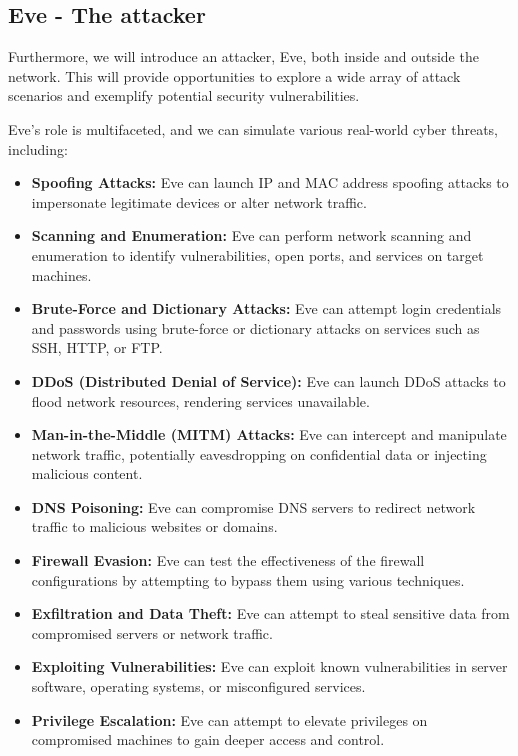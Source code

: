 \documentclass[a4paper,11pt,singlespacing]{article}
\begin{document}
\newpage

\subsection{Eve - The attacker}
Furthermore, we will introduce an attacker, Eve, both inside and outside the network. This will provide opportunities to explore a wide array of attack scenarios and exemplify potential security vulnerabilities.

Eve's role is multifaceted, and we can simulate various real-world cyber threats, including:

\begin{itemize}
    \item \textbf{Spoofing Attacks:} Eve can launch IP and MAC address spoofing attacks to impersonate legitimate devices or alter network traffic.

    \item \textbf{Scanning and Enumeration:} Eve can perform network scanning and enumeration to identify vulnerabilities, open ports, and services on target machines.

    \item \textbf{Brute-Force and Dictionary Attacks:} Eve can attempt login credentials and passwords using brute-force or dictionary attacks on services such as SSH, HTTP, or FTP.

    \item \textbf{DDoS (Distributed Denial of Service):} Eve can launch DDoS attacks to flood network resources, rendering services unavailable.

    \item \textbf{Man-in-the-Middle (MITM) Attacks:} Eve can intercept and manipulate network traffic, potentially eavesdropping on confidential data or injecting malicious content.

    \item \textbf{DNS Poisoning:} Eve can compromise DNS servers to redirect network traffic to malicious websites or domains.

    \item \textbf{Firewall Evasion:} Eve can test the effectiveness of the firewall configurations by attempting to bypass them using various techniques.

    \item \textbf{Exfiltration and Data Theft:} Eve can attempt to steal sensitive data from compromised servers or network traffic.

    \item \textbf{Exploiting Vulnerabilities:} Eve can exploit known vulnerabilities in server software, operating systems, or misconfigured services.

    \item \textbf{Privilege Escalation:} Eve can attempt to elevate privileges on compromised machines to gain deeper access and control.

\end{itemize}
\end{document}

